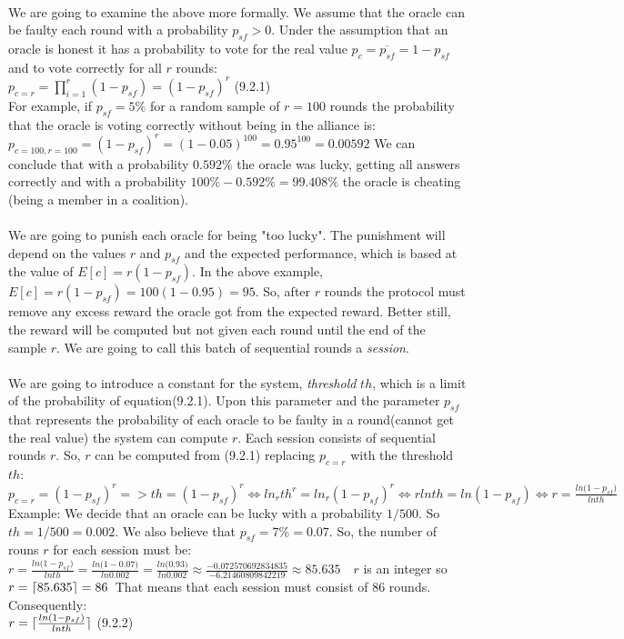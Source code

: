 \documentclass{article}
\DeclarePairedDelimiter{\ceil}{\lceil}{\rceil}
\begin{document}
{\paragraph{ }
We are going to examine the above more formally. We assume that the oracle can be faulty each round with a probability $p_{sf}>0$. Under the assumption that an oracle is honest it has a probability to vote for the real value $p_c=\overline{p_{sf}}=1-p_{sf}$ and to vote correctly for all $r$ rounds:\\
$p_{c=r}=\displaystyle\prod_{i=1}^r{(1-p_{sf})}=(1-p_{sf})^r$ (9.2.1)\\
For example, if $p_{sf}=5\%$ for a random sample of $r=100$ rounds the probability that the oracle is voting correctly without being in the alliance is:\\
$p_{c=100,r=100}=(1-p_{sf})^r=(1-0.05)^{100}=0.95^{100}=0.00592$
We can conclude that with a probability $0.592\%$ the oracle was lucky, getting all answers correctly and with a probability $100\%-0.592\%=99.408\%$ the oracle is cheating (being a member in a coalition).
\paragraph{ }
We are going to punish each oracle for being "too lucky". The punishment will depend on the values $r$ and $p_{sf}$ and the expected performance, which is based at the value of $E[c]=r(1-p_{sf})$. In the above example, $E[c]=r(1-p_{sf})=100(1-0.95)=95$.
So, after $r$ rounds the protocol must remove any excess reward the oracle got from the expected reward. Better still, the reward will be computed but not given each round until the end of the sample $r$. We are going to call this batch of sequential rounds a \emph{session}.
\paragraph{ }
We are going to introduce a constant for the system, \emph{threshold} $th$, which is a limit of the probability of equation(9.2.1). Upon this parameter and the parameter $p_{sf}$  that represents the probability of each oracle to be faulty in a round(cannot get the real value) the system can compute $r$. Each session consists of sequential rounds $r$. So, $r$ can be computed from (9.2.1) replacing $p_{c=r}$ with the threshold $th$:\\
$p_{c=r}=(1-p_{sf})^r=>th=(1-p_{sf})^r\Leftrightarrow ln_{r}th^r=ln_r{(1-p_{sf})^r} \Leftrightarrow rlnth=ln{(1-p_{sf})} \Leftrightarrow r= \frac{ln{(1-p_{sf}})}{lnth}$ \\
Example: We decide that an oracle can be lucky with a probability $1/500$. So $th=1/500=0.002$. We also believe that $p_{sf}=7\%=0.07$. So, the number of rouns $r$ for each session must be:
$r=\frac{ln{(1-p_{sf}})}{lnth}=\frac{ln{(1-0.07})}{ln0.002}=\frac{ln{(0.93})}{ln0.002}\approx\frac{-0.072570692834835}{-6.21460809842219}\approx85.635$~~$r$ is an integer so $r=\ceil*{85.635}=86$~That means that each session must consist of 86 rounds. Consequently:\\
$r=\ceil{\frac{ln{(1-p_{sf}})}{lnth}}$ (9.2.2) \\

}
\end{document}
